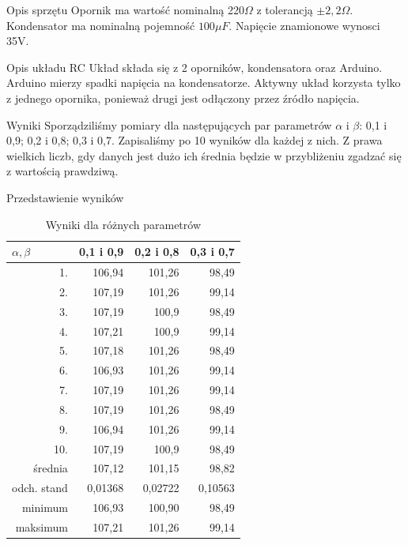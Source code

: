 \documentclass[8pt]{beamer}
\begin{document}
\begin{frame}{Opis sprzętu}
Opornik ma wartość nominalną 220$\Omega$ z tolerancją $\pm2,2\Omega$. Kondensator ma nominalną pojemność $100\mu F$. Napięcie znamionowe wynosci 35V.
\end{frame}

\begin{frame}{Opis układu RC}
Układ składa się z 2 oporników, kondensatora oraz Arduino. Arduino mierzy spadki napięcia na kondensatorze. Aktywny układ korzysta tylko z jednego opornika, ponieważ drugi jest odłączony przez źródło napięcia.
\end{frame}

\begin{frame}{Wyniki}
Sporządziliśmy pomiary dla następujących par parametrów $\alpha$ i $\beta$: 0,1 i 0,9; 0,2 i 0,8; 0,3 i 0,7. Zapisaliśmy po 10 wyników dla każdej z nich. Z prawa wielkich liczb, gdy danych jest dużo ich średnia będzie w przybliżeniu zgadzać się z wartością prawdziwą.
\end{frame}
\begin{frame}{Przedstawienie wyników}
\begin{table}[H]
  \centering
  \footnotesize
  \caption{Wyniki dla różnych parametrów}
    \begin{tabular}{|r|r|r|r|}
    \toprule
    \multicolumn{1}{|l|}{$\alpha, \beta$} & \multicolumn{1}{l|}{0,1 i 0,9} & \multicolumn{1}{l|}{0,2 i 0,8} & \multicolumn{1}{l|}{0,3 i 0,7} \\
    \midrule
    1.    & 106,94 & 101,26 & 98,49 \\
    \midrule
    2.    & 107,19 & 101,26 & 99,14 \\
    \midrule
    3.    & 107,19 & 100,9 & 98,49 \\
    \midrule
    4.    & 107,21 & 100,9 & 99,14 \\
    \midrule
    5.    & 107,18 & 101,26 & 98,49 \\
    \midrule
    6.    & 106,93 & 101,26 & 99,14 \\
    \midrule
    7.    & 107,19 & 101,26 & 99,14 \\
    \midrule
    8.    & 107,19 & 101,26 & 98,49 \\
    \midrule
    9.    & 106,94 & 101,26 & 99,14 \\
    \midrule
    10.   & 107,19 & 100,9 & 98,49 \\
    \midrule
    średnia    & 107,12 & 101,15 & 98,82 \\
    \midrule
    odch. stand   & 0,01368 & 0,02722 & 0,10563 \\
    \midrule
    minimum   & 106,93 & 100,90 & 98,49 \\
    \midrule
    maksimum   & 107,21 & 101,26 & 99,14 \\
    \bottomrule
    \end{tabular}%
  \label{tab:addlabel}%
\end{table}
\end{frame}
\end{document}
